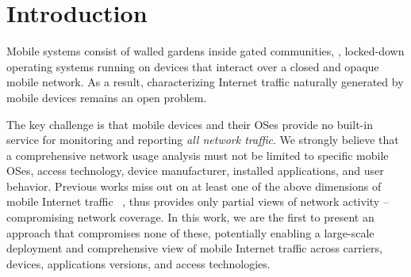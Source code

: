 \section{Introduction}
\label{sec:introduction}

Mobile systems consist of walled gardens inside gated communities, \ie{}, locked-down operating systems running on devices that interact over a closed and opaque mobile network. 
As a result, characterizing Internet traffic naturally generated by mobile devices remains an open problem. 

The key challenge is that mobile devices and their OSes provide no built-in service for monitoring and reporting \emph{all network traffic}. 
We strongly believe that a comprehensive network usage analysis must not be limited to specific mobile OSes, access technology, device manufacturer, installed applications, and user behavior. 
Previous works miss out on at least one of the above dimensions of mobile Internet traffic ~\cite{vallina-rod:ads,gerber:passivespeed,chen:wifi,enck:taintdroid,wang:middleboxes,sommers:cellwifi}, thus provides only partial views of network activity -- compromising network coverage. 
In this work, we are the first to present an approach that compromises none of these, potentially enabling a large-scale deployment and comprehensive view of  mobile Internet traffic across carriers, devices, applications versions, and access technologies.


